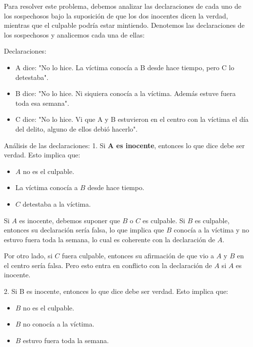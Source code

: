 \begin{solution}
    Para resolver este problema, debemos analizar las declaraciones de cada uno de los sospechosos bajo la suposición de que los dos inocentes dicen la verdad, mientras que el culpable podría estar mintiendo. Denotemos las declaraciones de los sospechosos y analicemos cada una de ellas:

Declaraciones:
\begin{itemize}
    \item A dice: "No lo hice. La víctima conocía a B desde hace tiempo, pero C lo detestaba".
    \item B dice: "No lo hice. Ni siquiera conocía a la víctima. Además estuve fuera toda esa semana".
    \item C dice: "No lo hice. Vi que A y B estuvieron en el centro con la víctima el día del delito, alguno de ellos debió hacerlo".
\end{itemize}

Análisis de las declaraciones:
1. Si \textbf{A es inocente}, entonces lo que dice debe ser verdad. Esto implica que:
   \begin{itemize}
        \item \( A \) no es el culpable.
        \item La víctima conocía a \( B \) desde hace tiempo.
        \item \( C \) detestaba a la víctima.
   \end{itemize}
   
   Si \( A \) es inocente, debemos suponer que \( B \) o \( C \) es culpable. Si \( B \) es culpable, entonces su declaración sería falsa, lo que implica que \( B \) conocía a la víctima y no estuvo fuera toda la semana, lo cual es coherente con la declaración de \( A \).

   Por otro lado, si \( C \) fuera culpable, entonces su afirmación de que vio a \( A \) y \( B \) en el centro sería falsa. Pero esto entra en conflicto con la declaración de \( A \) si \( A \) es inocente.

2. Si B es inocente, entonces lo que dice debe ser verdad. Esto implica que:
   \begin{itemize}
        \item \( B \) no es el culpable.
        \item \( B \) no conocía a la víctima.
        \item \( B \) estuvo fuera toda la semana.
   \end{itemize}
   

\end{solution}
